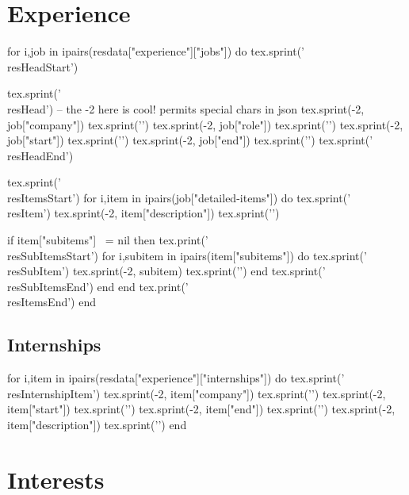 \documentclass[letterpaper,11pt]{article}
\makeatletter
\newcommand{\luaprint}[1]{\directlua{tex.print(#1)}}
\newcommand{\resHeadStart}{}
\newcommand{\resHead}[4]{
    \begin{tabular*}{\textwidth}{l@{\extracolsep{\fill}}r}
    \textbf{#1} - {#2} & \textit{#3 - #4} \\
    \end{tabular*}\vspace{-7pt}
}
\newcommand{\resHeadEnd}{\vspace{-7pt}}
\newcommand{\resItemsStart}{\begin{itemize}}
\newcommand{\resItem}[1]{\item{#1\vspace{-3pt}}}
\newcommand{\resItemsEnd}{\end{itemize}\vspace{0pt}}
\newcommand{\resSubItemsStart}{\begin{itemize}}
\newcommand{\resSubItem}[1]{\item{#1\vspace{0pt}}}
\newcommand{\resSubItemsEnd}{\end{itemize}\vspace{0pt}}
\newcommand{\resInternshipItem}[4]{\item{\textbf{#1} \small\textit{(#2 - #3)} - {#4}\vspace{0pt}}}
\makeatother
\begin{document}
\section{Experience}

\begin{luacode}
for i,job in ipairs(resdata["experience"]["jobs"]) do
    tex.sprint('\\resHeadStart')

    tex.sprint('\\resHead{')
    -- the -2 here is cool! permits special chars in json
    tex.sprint(-2, job["company"])
    tex.sprint('}{')
    tex.sprint(-2, job["role"])
    tex.sprint('}{')
    tex.sprint(-2, job["start"])
    tex.sprint('}{')
    tex.sprint(-2, job["end"])
    tex.sprint('}')
    tex.sprint('\\resHeadEnd')

    tex.sprint('\\resItemsStart')
    for i,item in ipairs(job["detailed-items"]) do
        tex.sprint('\\resItem{')
        tex.sprint(-2, item["description"])
        tex.sprint('}')

        if item["subitems"] ~= nil then
            tex.print('\\resSubItemsStart')
            for i,subitem in ipairs(item["subitems"]) do
                tex.sprint('\\resSubItem{')
                tex.sprint(-2, subitem)
                tex.sprint('}')
            end
            tex.sprint('\\resSubItemsEnd')
        end
    end
    tex.print('\\resItemsEnd')
end
\end{luacode}


{\vspace{0pt}}\subsection*{Internships}{\vspace{0pt}}
\resItemsStart
\begin{luacode}
    for i,item in ipairs(resdata["experience"]["internships"]) do
        tex.sprint('\\resInternshipItem{')
        tex.sprint(-2, item["company"])
        tex.sprint('}{')
        tex.sprint(-2, item["start"])
        tex.sprint('}{')
        tex.sprint(-2, item["end"])
        tex.sprint('}{')
        tex.sprint(-2, item["description"])
        tex.sprint('}')
    end
    \end{luacode}
\resItemsEnd


\section{Interests}
\luaprint{resdata["interests"]}
\end{document}
